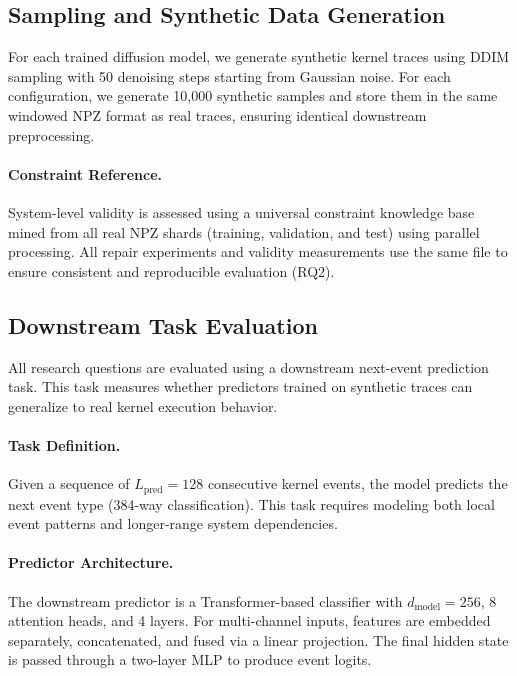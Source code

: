 \subsection{Sampling and Synthetic Data Generation}

For each trained diffusion model, we generate synthetic kernel traces using DDIM sampling with 50 denoising steps starting from Gaussian noise. For each configuration, we generate 10{,}000 synthetic samples and store them in the same windowed NPZ format as real traces, ensuring identical downstream preprocessing.

\paragraph{Constraint Reference.}
System-level validity is assessed using a universal constraint knowledge base mined from all real NPZ shards (training, validation, and test) using parallel processing. All repair experiments and validity measurements use the same file to ensure consistent and reproducible evaluation (RQ2).

\subsection{Downstream Task Evaluation}
\label{sec:downstream-eval}

All research questions are evaluated using a downstream next-event prediction task. This task measures whether predictors trained on synthetic traces can generalize to real kernel execution behavior.

\paragraph{Task Definition.}
Given a sequence of $L_{\text{pred}}=128$ consecutive kernel events, the model predicts the next event type (384-way classification). This task requires modeling both local event patterns and longer-range system dependencies.

\paragraph{Predictor Architecture.}
The downstream predictor is a Transformer-based classifier with $d_{\text{model}}=256$, 8 attention heads, and 4 layers. For multi-channel inputs, features are embedded separately, concatenated, and fused via a linear projection. The final hidden state is passed through a two-layer MLP to produce event logits.

